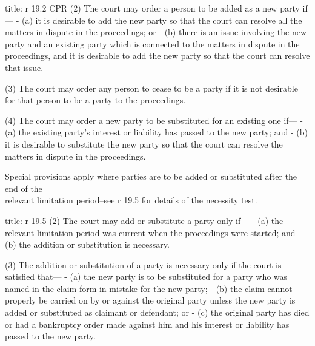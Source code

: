 \documentclass[
]{article}
\newenvironment{Shaded}{}{}
\newcommand{\NormalTok}[1]{#1}
\begin{document}
\begin{Shaded}
\begin{Highlighting}[]
\NormalTok{title: r 19.2 CPR}
\NormalTok{(2) The court may order a person to be added as a new party if—}
\NormalTok{{-} (a) it is desirable to add the new party so that the court can resolve all the matters in dispute in the proceedings; or}
\NormalTok{{-} (b) there is an issue involving the new party and an existing party which is connected to the matters in dispute in the proceedings, and it is desirable to add the new party so that the court can resolve that issue.}

\NormalTok{(3) The court may order any person to cease to be a party if it is not desirable for that person to be a}
\NormalTok{party to the proceedings.}

\NormalTok{(4) The court may order a new party to be substituted for an existing one if—}
\NormalTok{{-} (a) the existing party’s interest or liability has passed to the new party; and}
\NormalTok{{-} (b) it is desirable to substitute the new party so that the court can resolve the matters in dispute in the proceedings.}
\end{Highlighting}
\end{Shaded}

Special provisions apply where parties are to be added or substituted
after the end of the\\
relevant limitation period--see r 19.5 for details of the necessity
test.

\begin{Shaded}
\begin{Highlighting}[]
\NormalTok{title: r 19.5}
\NormalTok{(2) The court may add or substitute a party only if—}
\NormalTok{{-} (a) the relevant limitation period was current when the proceedings were started; and}
\NormalTok{{-} (b) the addition or substitution is necessary.}

\NormalTok{(3) The addition or substitution of a party is necessary only if the court is satisfied that—}
\NormalTok{{-} (a) the new party is to be substituted for a party who was named in the claim form in mistake for the new party;}
\NormalTok{{-} (b) the claim cannot properly be carried on by or against the original party unless the new party is added or substituted as claimant or defendant; or}
\NormalTok{{-} (c) the original party has died or had a bankruptcy order made against him and his interest or liability has passed to the new party.}
\end{Highlighting}
\end{Shaded}
\end{document}

